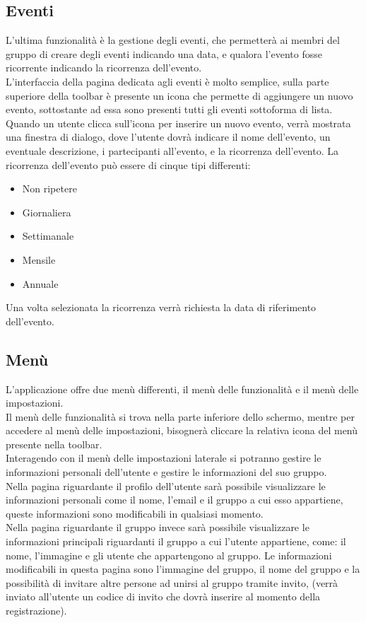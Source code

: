 \subsection{Eventi}
L'ultima funzionalità è la gestione degli eventi, che permetterà ai membri del gruppo di creare degli eventi indicando una data, e qualora l'evento fosse ricorrente indicando la ricorrenza dell'evento.\\
L'interfaccia della pagina dedicata agli eventi è molto semplice, sulla parte superiore della toolbar è presente un icona che permette di aggiungere un nuovo evento, sottostante ad essa sono presenti tutti gli eventi sottoforma di lista.\\
Quando un utente clicca sull'icona per inserire un nuovo evento, verrà mostrata una finestra di dialogo, dove l'utente dovrà indicare il nome dell'evento, un eventuale descrizione, i partecipanti all'evento, e la ricorrenza dell'evento. La ricorrenza dell'evento può essere di cinque tipi differenti:
\begin{itemize}
  \item Non ripetere
  \item Giornaliera
  \item Settimanale
  \item Mensile
  \item Annuale
\end{itemize}
Una volta selezionata la ricorrenza verrà richiesta la data di riferimento dell'evento.\\




\subsection{Menù}
L'applicazione offre due menù differenti, il menù delle funzionalità e il menù delle impostazioni.\\
Il menù delle funzionalità si trova nella parte inferiore dello schermo, mentre per accedere al menù delle impostazioni, bisognerà cliccare la relativa icona del menù presente nella toolbar.\\
Interagendo con il menù delle impostazioni laterale si potranno gestire le informazioni personali dell'utente e gestire le informazioni del suo gruppo.\\
Nella pagina riguardante il profilo dell'utente sarà possibile visualizzare le informazioni personali come il nome, l'email e il gruppo a cui esso appartiene, queste informazioni sono modificabili in qualsiasi momento.\\
Nella pagina riguardante il gruppo invece sarà possibile visualizzare le informazioni principali riguardanti il gruppo a cui l'utente appartiene, come: il nome, l'immagine e gli utente che appartengono al gruppo. Le informazioni modificabili in questa pagina sono l'immagine del gruppo, il nome del gruppo e la possibilità di invitare altre persone ad unirsi al gruppo tramite invito, (verrà inviato all'utente un codice di invito che dovrà inserire al momento della registrazione).\\
